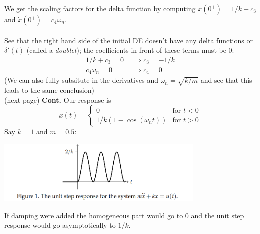 \documentclass{report}
\begin{document}
We get the scaling factors for the delta function by computing $x(0^+)=1/k+c_3$ and $\dot{x}(0^+)=c_4\omega_n$.\\
\vspace{1mm}\\
See that the right hand side of the initial DE doesn't have any delta functions or $\delta'(t)$ 
(called a \textit{doublet}); the coefficients in front of
these terms must be 0:
\begin{align*}
1/k+c_3=0&\implies c_3=-1/k\\
c_4\omega_n=0&\implies c_4=0
\end{align*}
(We can also fully subsitute in the derivatives and $\omega_n=\sqrt{k/m}$ 
and see that this leads to the same conclusion)\\
(next page)\newpage
\noindent\textbf{Cont.}
Our response is
\begin{equation*}
x(t)=\begin{cases}
0&\text{for }t<0\\
1/k(1-\cos(\omega_nt))&\text{for }t>0
\end{cases}
\end{equation*}
Say $k=1$ and $m=0.5$:
\begin{center}
\includegraphics[width=10cm]{54}\\
\end{center}
If damping were added the homogeneous part would go to 0 and the unit step response would go asymptotically to 
$1/k$.
\newpage
\end{document}
